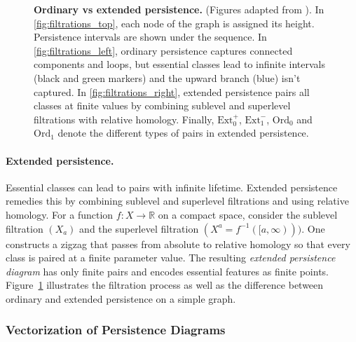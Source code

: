 \begin{figure}[t]
  \caption{\textbf{Ordinary vs extended persistence.} (Figures adapted from \cite{perslay}). In \ref{fig:filtrations_top}, each node of the graph is assigned its height. Persistence intervals are shown under the sequence. In \ref{fig:filtrations_left}, ordinary persistence captures connected components and loops, but essential classes lead to infinite intervals (black and green markers) and the upward branch (blue) isn't captured. In \ref{fig:filtrations_right}, extended persistence pairs all classes at finite values by combining sublevel and superlevel filtrations with relative homology. Finally, $\text{Ext}_0^+$, $\text{Ext}_1^-$, $\text{Ord}_0$ and $\text{Ord}_1$ denote the different types of pairs in extended persistence.}
  \label{fig:filtrations}
\end{figure}


\paragraph{Extended persistence.}
Essential classes can lead to pairs with infinite lifetime. Extended persistence remedies this by combining sublevel and superlevel filtrations and using relative homology. For a function $f:X\to\mathbb{R}$ on a compact space, consider the sublevel filtration $(X_a)$ and the superlevel filtration $(X^a = f^{-1}([a,\infty)))$. One constructs a zigzag that passes from absolute to relative homology so that every class is paired at a finite parameter value. The resulting \emph{extended persistence diagram} has only finite pairs and encodes essential features as finite points. Figure~\ref{fig:filtrations} illustrates the filtration process as well as the difference between ordinary and extended persistence on a simple graph.


\subsubsection{Vectorization of Persistence Diagrams}
\label{sssec:vectorization_persistence_diagrams}

